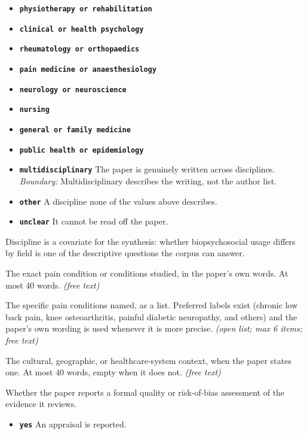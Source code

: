 \documentclass[11pt]{article}
\begin{document}
\begin{description}
  \begin{itemize}[leftmargin=1.3em,itemsep=2pt,topsep=2pt]
  \item \textbf{\texttt{physiotherapy or rehabilitation}} 
  \item \textbf{\texttt{clinical or health psychology}} 
  \item \textbf{\texttt{rheumatology or orthopaedics}} 
  \item \textbf{\texttt{pain medicine or anaesthesiology}} 
  \item \textbf{\texttt{neurology or neuroscience}} 
  \item \textbf{\texttt{nursing}} 
  \item \textbf{\texttt{general or family medicine}} 
  \item \textbf{\texttt{public health or epidemiology}} 
  \item \textbf{\texttt{multidisciplinary}} The paper is genuinely written across disciplines. {\small \textit{Boundary:} Multidisciplinary describes the writing, not the author list.}
  \item \textbf{\texttt{other}} A discipline none of the values above describes.
  \item \textbf{\texttt{unclear}} It cannot be read off the paper.
  \end{itemize}
{\small Discipline is a covariate for the synthesis: whether biopsychosocial usage differs by field is one of the descriptive questions the corpus can answer.}
\item[\texttt{pain\_condition\_detail}] The exact pain condition or conditions studied, in the paper's own words. At most 40 words. \textit{(free text)}
\item[\texttt{pain\_conditions}] The specific pain conditions named, as a list. Preferred labels exist (chronic low back pain, knee osteoarthritis, painful diabetic neuropathy, and others) and the paper's own wording is used whenever it is more precise. \textit{(open list; max 6 items; free text)}
\item[\texttt{context\_note}] The cultural, geographic, or healthcare-system context, when the paper states one. At most 40 words, empty when it does not. \textit{(free text)}
\item[\texttt{quality\_assessment\_reported}] Whether the paper reports a formal quality or risk-of-bias assessment of the evidence it reviews.
  \begin{itemize}[leftmargin=1.3em,itemsep=2pt,topsep=2pt]
  \item \textbf{\texttt{yes}} An appraisal is reported.

\end{itemize}
\end{description}
\end{document}
